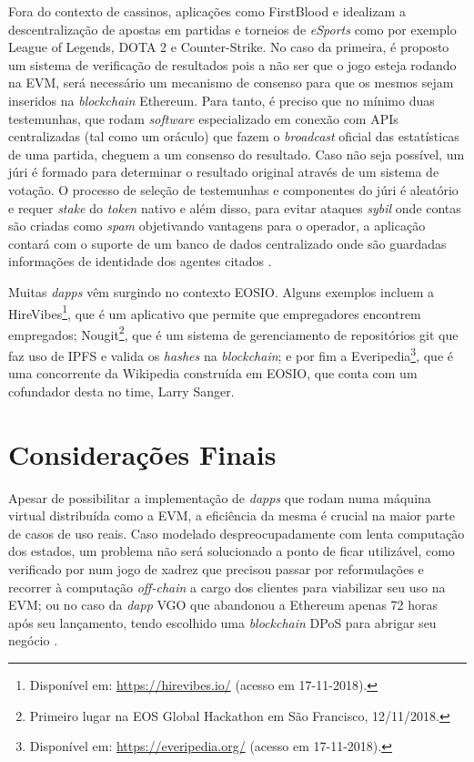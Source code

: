 \documentclass[a4paper,12pt]{monografia}
\theoremstyle{plain}
\theoremstyle{definition}
\theoremstyle{remark}
\begin{document}
Fora do contexto de cassinos, aplica\c{c}\~{o}es como FirstBlood e  idealizam a descentraliza\c{c}\~{a}o de apostas em partidas e torneios de \textit{eSports} como por exemplo League of Legends, DOTA 2 e Counter-Strike.
No caso da primeira, \'{e} proposto um sistema de verifica\c{c}\~{a}o de resultados pois a n\~{a}o ser que o jogo esteja rodando na EVM, ser\'{a} necess\'{a}rio um mecanismo de consenso para que os mesmos sejam inseridos na \textit{blockchain} Ethereum.
Para tanto, \'{e} preciso que no m\'{i}nimo duas testemunhas, que rodam \textit{software} especializado em conex\~{a}o com APIs centralizadas (tal como um or\'{a}culo) que fazem o \textit{broadcast} oficial das estat\'{i}sticas de uma partida, cheguem a um consenso do resultado.
Caso n\~{a}o seja poss\'{i}vel, um j\'{u}ri \'{e} formado para determinar o resultado original atrav\'{e}s de um sistema de vota\c{c}\~{a}o. 
O processo de sele\c{c}\~{a}o de testemunhas e componentes do j\'{u}ri \'{e} aleat\'{o}rio e requer \textit{stake} do \textit{token} nativo e al\'{e}m disso, para evitar ataques \textit{sybil} onde contas s\~{a}o criadas como \textit{spam} objetivando vantagens para o operador, a aplica\c{c}\~{a}o contar\'{a} com o suporte de um banco de dados centralizado onde s\~{a}o guardadas informa\c{c}\~{o}es de identidade dos agentes citados \cite{firstblood}.

Muitas \textit{dapps} v\^em surgindo no contexto EOSIO.
Alguns exemplos incluem a HireVibes\footnote{Dispon\'ivel em: \url{https://hirevibes.io/} (acesso em 17-11-2018).}, que \'e um aplicativo que permite que empregadores encontrem empregados;
Nougit\footnote{Primeiro lugar na EOS Global Hackathon em S\~ao Francisco, 12/11/2018.}, que \'e um sistema de gerenciamento de reposit\'orios git que faz uso de IPFS e valida os \textit{hashes} na \textit{blockchain};
e por fim a Everipedia\footnote{Dispon\'ivel em: \url{https://everipedia.org/} (acesso em 17-11-2018).}, que \'e uma concorrente da Wikipedia constru\'ida em EOSIO, que conta com um cofundador desta no time, Larry Sanger.

\section{Considera\c{c}\~oes Finais}

Apesar de possibilitar a implementa\c{c}\~{a}o de \textit{dapps} que rodam numa m\'{a}quina virtual distribu\'{i}da como a EVM, a efici\^{e}ncia da mesma \'{e} crucial na maior parte de casos de uso reais.
Caso modelado despreocupadamente com lenta computa\c{c}\~{a}o dos estados, um problema n\~{a}o ser\'{a} solucionado a ponto de ficar utiliz\'{a}vel, como verificado por  num jogo de xadrez que precisou passar por reformula\c{c}\~{o}es e recorrer \`{a} computa\c{c}\~{a}o \textit{off-chain} a cargo dos clientes para viabilizar seu uso na EVM; ou no caso da \textit{dapp} VGO que abandonou a Ethereum apenas 72 horas ap\'os seu lan\c{c}amento, tendo escolhido uma \textit{blockchain} DPoS para abrigar seu neg\'ocio \cite{wax}.
\end{document}
